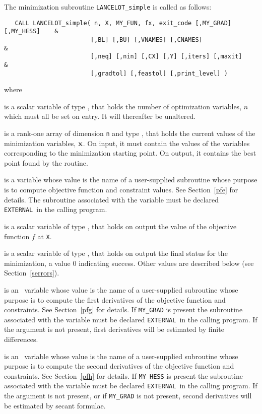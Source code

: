 \documentclass{galahad}
\newcommand{\external}{{\tt EXTERNAL}}
\begin{document}
The minimization subroutine {\tt LANCELOT\_simple} is called as follows:
\hskip0.5in
\def\baselinestretch{0.8} {\tt \begin{verbatim}
   CALL LANCELOT_simple( n, X, MY_FUN, fx, exit_code [,MY_GRAD] [,MY_HESS]    &
                        [,BL] [,BU] [,VNAMES] [,CNAMES]                       &
                        [,neq] [,nin] [,CX] [,Y] [,iters] [,maxit]            &
                        [,gradtol] [,feastol] [,print_level] )
\end{verbatim}}
\def\baselinestretch{1.0}
\noindent
where
\begin{description}
 is a scalar variable of type \integer, that holds
the number of optimization variables, $n$ which must all be set on entry. It
will thereafter be unaltered.

 is a rank-one array of dimension {\tt n} and type
\realdp, that holds the current values of the
minimization variables, ${\mathbf{x}}$. On input, it must contain the values of the
variables corresponding to the minimization starting point.  On output, it
contains the best point found by the routine.

 is a variable whose value is the name of a
user-supplied subroutine whose purpose is to compute objective function
and constraint values. See Section~\ref{pfe} for details.
The subroutine associated with the variable must be declared \external\
in the calling program.

 is a scalar variable of type \realdp, that
holds  on output the value of the objective function $f$ at {\tt X}.

 is a scalar variable of type \integer, that holds
on output the final status for the minimization, a value 0 indicating
success.  Other values are described below (see Section~\ref{serrors}).

 is an \optional\ variable whose value is the name of a
user-supplied subroutine whose purpose is to compute the first derivatives
of the objective function and constraints. See Section~\ref{pfg} for details.
If {\tt MY\_GRAD} is present the subroutine associated with the variable must be
declared \external\ in the calling program. If the argument is not present,
first derivatives will be estimated by finite differences.

 is an \optional\ variable whose value is the name of a
user-supplied subroutine whose purpose is to compute the second derivatives
of the objective function and constraints. See Section~\ref{pfh} for details.
If {\tt MY\_HESS} is present the subroutine associated with the variable must be
declared \external\ in the calling program. If the argument is not present,
or if {\tt MY\_GRAD} is not present,
second derivatives will be estimated by secant formulae.


\end{description}
\end{document}
